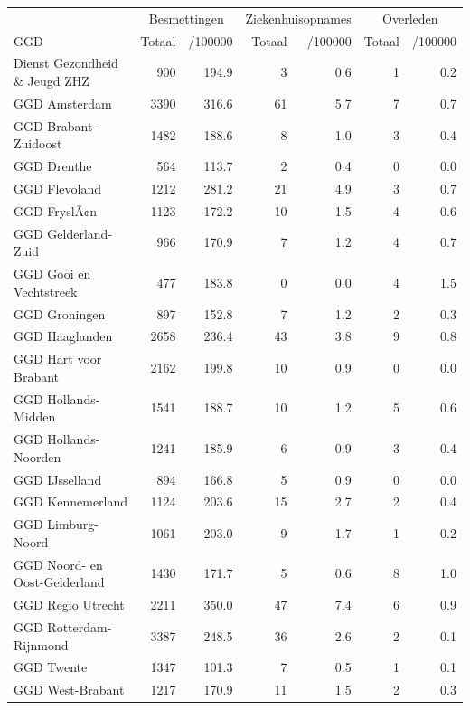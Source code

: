 \documentclass[
  english,
  man,floatsintext]{apa6}
\begin{document}
\begin{table}
\centering\begingroup\fontsize{10}{12}\selectfont

\begin{threeparttable}
\begin{tabular}{lrrrrrr}
\toprule
\multicolumn{1}{c}{ } & \multicolumn{2}{c}{Besmettingen} & \multicolumn{2}{c}{Ziekenhuisopnames} & \multicolumn{2}{c}{Overleden} \\
\cmidrule(l{3pt}r{3pt}){2-3} \cmidrule(l{3pt}r{3pt}){4-5} \cmidrule(l{3pt}r{3pt}){6-7}
GGD & Totaal & /100000 & Totaal & /100000 & Totaal & /100000\\
\midrule
Dienst Gezondheid \& Jeugd ZHZ & 900 & 194.9 & 3 & 0.6 & 1 & 0.2\\
GGD Amsterdam & 3390 & 316.6 & 61 & 5.7 & 7 & 0.7\\
GGD Brabant-Zuidoost & 1482 & 188.6 & 8 & 1.0 & 3 & 0.4\\
GGD Drenthe & 564 & 113.7 & 2 & 0.4 & 0 & 0.0\\
GGD Flevoland & 1212 & 281.2 & 21 & 4.9 & 3 & 0.7\\
GGD FryslÃ¢n & 1123 & 172.2 & 10 & 1.5 & 4 & 0.6\\
GGD Gelderland-Zuid & 966 & 170.9 & 7 & 1.2 & 4 & 0.7\\
GGD Gooi en Vechtstreek & 477 & 183.8 & 0 & 0.0 & 4 & 1.5\\
GGD Groningen & 897 & 152.8 & 7 & 1.2 & 2 & 0.3\\
GGD Haaglanden & 2658 & 236.4 & 43 & 3.8 & 9 & 0.8\\
GGD Hart voor Brabant & 2162 & 199.8 & 10 & 0.9 & 0 & 0.0\\
GGD Hollands-Midden & 1541 & 188.7 & 10 & 1.2 & 5 & 0.6\\
GGD Hollands-Noorden & 1241 & 185.9 & 6 & 0.9 & 3 & 0.4\\
GGD IJsselland & 894 & 166.8 & 5 & 0.9 & 0 & 0.0\\
GGD Kennemerland & 1124 & 203.6 & 15 & 2.7 & 2 & 0.4\\
GGD Limburg-Noord & 1061 & 203.0 & 9 & 1.7 & 1 & 0.2\\
GGD Noord- en Oost-Gelderland & 1430 & 171.7 & 5 & 0.6 & 8 & 1.0\\
GGD Regio Utrecht & 2211 & 350.0 & 47 & 7.4 & 6 & 0.9\\
GGD Rotterdam-Rijnmond & 3387 & 248.5 & 36 & 2.6 & 2 & 0.1\\
GGD Twente & 1347 & 101.3 & 7 & 0.5 & 1 & 0.1\\
GGD West-Brabant & 1217 & 170.9 & 11 & 1.5 & 2 & 0.3\\

\end{tabular}
\end{threeparttable}
\end{table}
\end{document}
